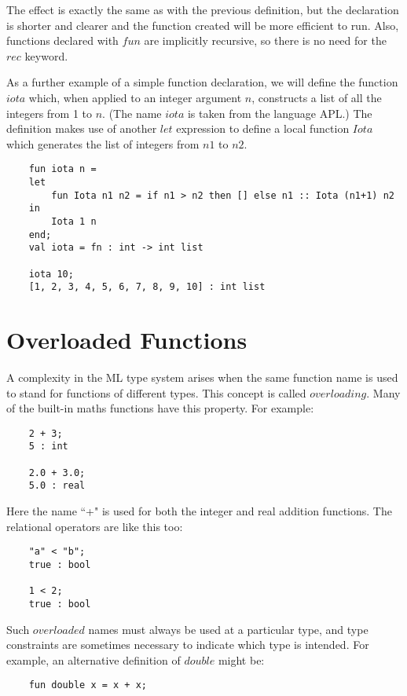 The effect is exactly the same as with the previous definition, but the
declaration is shorter and clearer and the function created will be more
efficient to run. Also, functions declared with $fun$ are implicitly
recursive, so there is no need for the $rec$ keyword.

As a further example of a simple function declaration, we will define
the function $iota$ which, when applied to an integer argument $n$,
constructs a list of all the integers from 1 to $n$. (The name $iota$ is
taken from the language APL.) The definition makes use of another $let$
expression to define a local function $Iota$ which generates the list of
integers from $n1$ to $n2$.
\begin{verbatim}
    fun iota n =
    let
        fun Iota n1 n2 = if n1 > n2 then [] else n1 :: Iota (n1+1) n2
    in
        Iota 1 n
    end;
    val iota = fn : int -> int list

    iota 10;
    [1, 2, 3, 4, 5, 6, 7, 8, 9, 10] : int list
\end{verbatim}


\section{Overloaded Functions}

A complexity in the ML type system arises when the same function name is
used to stand for functions of different types. This concept is called
$overloading$. Many of the built-in maths functions have this property.
For example:
\begin{verbatim}
    2 + 3;
    5 : int

    2.0 + 3.0;
    5.0 : real
\end{verbatim}

Here the name ``+" is used for both the integer and real addition
functions. The relational operators are like this too:
\begin{verbatim}
    "a" < "b";
    true : bool

    1 < 2;
    true : bool
\end{verbatim}

Such $overloaded$ names must always be used at a particular type, and
type constraints are sometimes necessary to indicate which type is
intended. For example, an alternative definition of $double$ might be:

\begin{verbatim}
	fun double x = x + x;
\end{verbatim}

